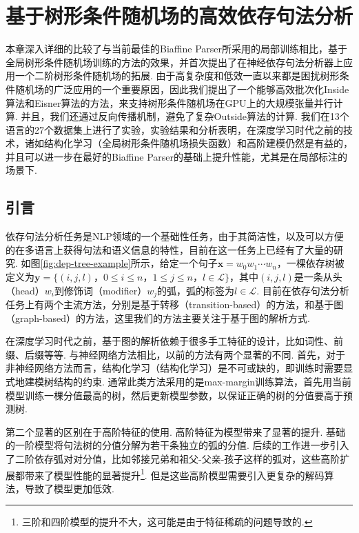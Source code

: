 \chapter{基于树形条件随机场的高效依存句法分析}\label{cha:dep-crf}

本章深入详细的比较了与当前最佳的Biaffine Parser所采用的局部训练相比，基于全局树形条件随机场训练的方法的效果，并首次提出了在神经依存句法分析器上应用一个二阶树形条件随机场的拓展.
由于高复杂度和低效一直以来都是困扰树形条件随机场的广泛应用的一个重要原因，因此我们提出了一个能够高效批次化Inside算法和Eisner算法的方法，来支持树形条件随机场在GPU上的大规模张量并行计算.
并且，我们还通过反向传播机制，避免了复杂Outside算法的计算.
我们在13个语言的27个数据集上进行了实验，实验结果和分析表明，在深度学习时代之前的技术，诸如结构化学习（全局树形条件随机场损失函数）和高阶建模仍然是有益的，并且可以进一步在最好的Biaffine Parser的基础上提升性能，尤其是在局部标注的场景下.

\section{引言}

依存句法分析任务是NLP领域的一个基础性任务，由于其简洁性，以及可以方便的在多语言上获得句法和语义信息的特性，目前在这一任务上已经有了大量的研究. 如图\ref{fig:dep-tree-example}所示，给定一个句子$\boldsymbol{x}=w_0w_1\cdots w_n$，一棵依存树被定义为$\boldsymbol{y}=\{(i,j,l)，0\le i \le n，1 \le j \le n，l \in \mathcal{L}\}$，其中$(i,j,l)$是一条从头（head）$w_i$到修饰词（modifier）$w_j$的弧，弧的标签为$l \in \mathcal{L}$. 目前在依存句法分析任务上有两个主流方法，分别是基于转移（transition-based）的方法，和基于图（graph-based）的方法，这里我们的方法主要关注于基于图的解析方式.

在深度学习时代之前，基于图的解析依赖于很多手工特征的设计，比如词性、前缀、后缀等等.
与神经网络方法相比，以前的方法有两个显著的不同.
首先，对于非神经网络方法而言，结构化学习（结构化学习）是不可或缺的，即训练时需要显式地建模树结构的约束.
通常此类方法采用的是max-margin训练算法，首先用当前模型训练一棵分值最高的树，然后更新模型参数，以保证正确的树的分值要高于预测树.

第二个显著的区别在于高阶特征的使用. 高阶特征为模型带来了显著的提升.
基础的一阶模型将句法树的分值分解为若干条独立的弧的分值\cite{mcdonald-etal-2005-online}. 后续的工作进一步引入了二阶依存弧对对分值，比如邻接兄弟\cite{mcdonald-pereira-2006-online}和祖父-父亲-孩子这样的弧对\cite{carreras-2007-experiments,koo-collins-2010-efficient}，这些高阶扩展都带来了模型性能的显著提升\footnote{三阶和四阶模型的提升不大，这可能是由于特征稀疏的问题导致的\cite{koo-collins-2010-efficient,ma-zhao-2012-fourth}.}. 但是这些高阶模型需要引入更复杂的解码算法，导致了模型更加低效.


